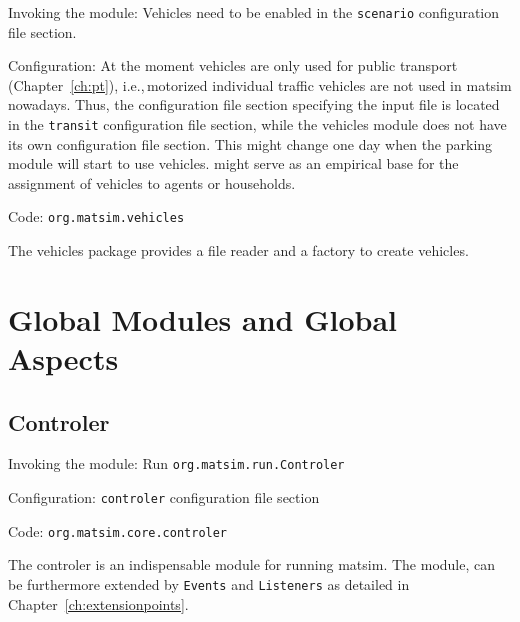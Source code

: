 \begin{compactitem}
\item Invoking the module: Vehicles need to be enabled in the \lstinline|scenario| configuration file section.
\item Configuration: At the moment vehicles are only used for public transport (Chapter~\ref{ch:pt}), i.e.,\,motorized individual traffic vehicles are not used in \gls{matsim} nowadays. Thus, the configuration file section specifying the input file is located in the \lstinline|transit| configuration file section, while the vehicles module does not have its own configuration file section. 
%
This might change one day when the parking module will start to use vehicles. \citet[][]{JaeggiEtAl_TRR_2012} might serve as an empirical base for the assignment of vehicles to agents or households.
\item Code: \lstinline|org.matsim.vehicles|
\end{compactitem}

The vehicles package provides a file reader and a factory to create vehicles.

\section{Global Modules and Global Aspects}
\label{sec:globalmodules}
\subsection{Controler}
\label{sec:controler}
\begin{compactitem}
\item Invoking the module: Run \lstinline|org.matsim.run.Controler|
\item Configuration: \lstinline|controler| configuration file section
\item Code: \lstinline|org.matsim.core.controler|
\end{compactitem}

The controler is an indispensable module for running \gls{matsim}. The module, can be furthermore extended by \lstinline|Events| and \lstinline|Listeners| as detailed in Chapter~\ref{ch:extensionpoints}. 
%

